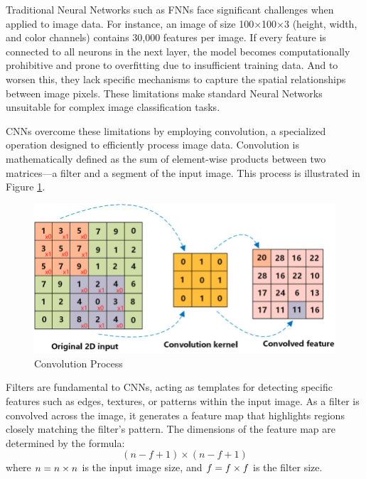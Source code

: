 Traditional Neural Networks such as FNNs face significant challenges when applied to image data. For instance, an image of size 100×100×3 (height, width, and color channels) contains 30,000 features per image. If every feature is connected to all neurons in the next layer, the model becomes computationally prohibitive and prone to overfitting due to insufficient training data. And to worsen this, they lack specific mechanisms to capture the spatial relationships between image pixels. These limitations make standard Neural Networks unsuitable for complex image classification tasks.

CNNs overcome these limitations by employing convolution, a specialized operation designed to efficiently process image data. Convolution is mathematically defined as the sum of element-wise products between two matrices—a filter and a segment of the input image. This process is illustrated in Figure \ref{fig:conv_process}.

\begin{figure}[h!]
    \centering
    \includegraphics[width=1\linewidth]{images/convolution_process.png}
    \caption{Convolution Process}
    \label{fig:conv_process}
\end{figure}

Filters are fundamental to CNNs, acting as templates for detecting specific features such as edges, textures, or patterns within the input image. As a filter is convolved across the image, it generates a feature map that highlights regions closely matching the filter's pattern. The dimensions of the feature map are determined by the formula:
\[
(n - f + 1) \times (n - f + 1)
\]
where \(n \space = \space  n \times n \) is the input image size, and \( f \space = \space f \times f \) is the filter size.

